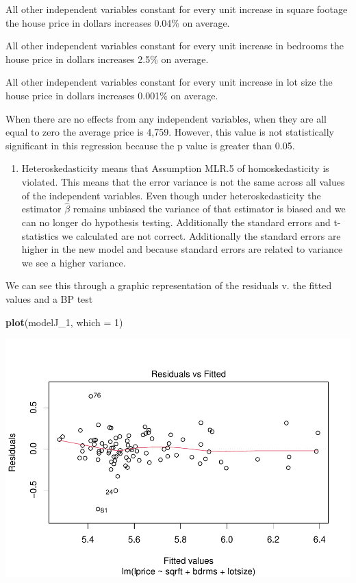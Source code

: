 \documentclass[
  12pt,
  landscape]{article}
\newenvironment{Shaded}{\begin{snugshade}}{\end{snugshade}}
\newcommand{\DataTypeTok}[1]{\textcolor[rgb]{0.13,0.29,0.53}{#1}}
\newcommand{\DecValTok}[1]{\textcolor[rgb]{0.00,0.00,0.81}{#1}}
\newcommand{\KeywordTok}[1]{\textcolor[rgb]{0.13,0.29,0.53}{\textbf{#1}}}
\newcommand{\NormalTok}[1]{#1}
\providecommand{\tightlist}{%
  \setlength{\itemsep}{0pt}\setlength{\parskip}{0pt}}
\begin{document}
All other independent variables constant for every unit increase in
square footage the house price in dollars increases 0.04\% on average.

All other independent variables constant for every unit increase in
bedrooms the house price in dollars increases 2.5\% on average.

All other independent variables constant for every unit increase in lot
size the house price in dollars increases 0.001\% on average.

When there are no effects from any independent variables, when they are
all equal to zero the average price is 4,759. However, this value is not
statistically significant in this regression because the p value is
greater than 0.05.

\begin{enumerate}
\def\labelenumi{(\alph{enumi})}
\setcounter{enumi}{10}
\tightlist
\item
  Heteroskedasticity means that Assumption MLR.5 of homoskedasticity is
  violated. This means that the error variance is not the same across
  all values of the independent variables. Even though under
  heteroskedasticity the estimator \(\hat\beta\) remains unbiased the
  variance of that estimator is biased and we can no longer do
  hypothesis testing. Additionally the standard errors and t-statistics
  we calculated are not correct. Additionally the standard errors are
  higher in the new model and because standard errors are related to
  variance we see a higher variance.
\end{enumerate}

We can see this through a graphic representation of the residuals v. the
fitted values and a BP test

\begin{Shaded}
\begin{Highlighting}[]
\KeywordTok{plot}\NormalTok{(modelJ_}\DecValTok{1}\NormalTok{, }\DataTypeTok{which =} \DecValTok{1}\NormalTok{)}
\end{Highlighting}
\end{Shaded}

\includegraphics{Ogle_MicroMetricsAssignment_2_Q2_files/figure-latex/unnamed-chunk-12-1.pdf}
\end{document}
